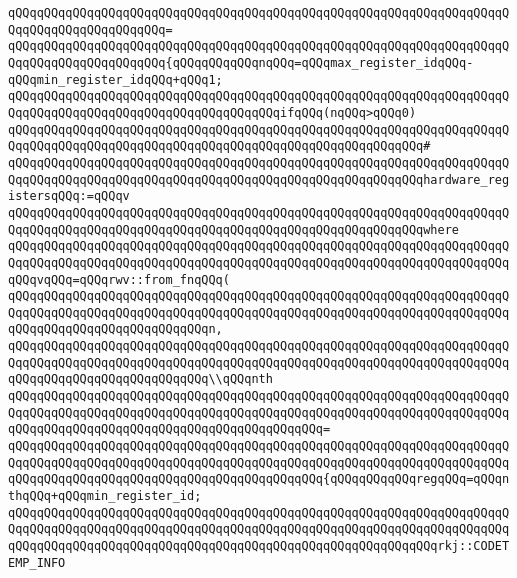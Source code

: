 \verb|qQQqqQQqqQQqqQQqqQQqqQQqqQQqqQQqqQQqqQQqqQQqqQQqqQQqqQQqqQQqqQQqqQQqqQQqqQQqqQQqqQQqqQQqqQQq=|\newline
\verb|qQQqqQQqqQQqqQQqqQQqqQQqqQQqqQQqqQQqqQQqqQQqqQQqqQQqqQQqqQQqqQQqqQQqqQQqqQQqqQQqqQQqqQQqqQQq{qQQqqQQqqQQqnqQQq=qQQqmax_register_idqQQq-qQQqmin_register_idqQQq+qQQq1;|\newline
\newline
\verb|qQQqqQQqqQQqqQQqqQQqqQQqqQQqqQQqqQQqqQQqqQQqqQQqqQQqqQQqqQQqqQQqqQQqqQQqqQQqqQQqqQQqqQQqqQQqqQQqqQQqqQQqqQQqifqQQq(nqQQq>qQQq0)|\newline
\verb|qQQqqQQqqQQqqQQqqQQqqQQqqQQqqQQqqQQqqQQqqQQqqQQqqQQqqQQqqQQqqQQqqQQqqQQqqQQqqQQqqQQqqQQqqQQqqQQqqQQqqQQqqQQqqQQqqQQqqQQqqQQqqQQq#|\newline
\verb|qQQqqQQqqQQqqQQqqQQqqQQqqQQqqQQqqQQqqQQqqQQqqQQqqQQqqQQqqQQqqQQqqQQqqQQqqQQqqQQqqQQqqQQqqQQqqQQqqQQqqQQqqQQqqQQqqQQqqQQqqQQqqQQqhardware_registersqQQq:=qQQqv|\newline
\verb|qQQqqQQqqQQqqQQqqQQqqQQqqQQqqQQqqQQqqQQqqQQqqQQqqQQqqQQqqQQqqQQqqQQqqQQqqQQqqQQqqQQqqQQqqQQqqQQqqQQqqQQqqQQqqQQqqQQqqQQqqQQqqQQqwhere|\newline
\verb|qQQqqQQqqQQqqQQqqQQqqQQqqQQqqQQqqQQqqQQqqQQqqQQqqQQqqQQqqQQqqQQqqQQqqQQqqQQqqQQqqQQqqQQqqQQqqQQqqQQqqQQqqQQqqQQqqQQqqQQqqQQqqQQqqQQqqQQqqQQqqQQqvqQQq=qQQqrwv::from_fnqQQq(|\newline
\verb|qQQqqQQqqQQqqQQqqQQqqQQqqQQqqQQqqQQqqQQqqQQqqQQqqQQqqQQqqQQqqQQqqQQqqQQqqQQqqQQqqQQqqQQqqQQqqQQqqQQqqQQqqQQqqQQqqQQqqQQqqQQqqQQqqQQqqQQqqQQqqQQqqQQqqQQqqQQqqQQqqQQqqQQqn,|\newline
\verb|qQQqqQQqqQQqqQQqqQQqqQQqqQQqqQQqqQQqqQQqqQQqqQQqqQQqqQQqqQQqqQQqqQQqqQQqqQQqqQQqqQQqqQQqqQQqqQQqqQQqqQQqqQQqqQQqqQQqqQQqqQQqqQQqqQQqqQQqqQQqqQQqqQQqqQQqqQQqqQQqqQQqqQQq\\qQQqnth|\newline
\verb|qQQqqQQqqQQqqQQqqQQqqQQqqQQqqQQqqQQqqQQqqQQqqQQqqQQqqQQqqQQqqQQqqQQqqQQqqQQqqQQqqQQqqQQqqQQqqQQqqQQqqQQqqQQqqQQqqQQqqQQqqQQqqQQqqQQqqQQqqQQqqQQqqQQqqQQqqQQqqQQqqQQqqQQqqQQqqQQqqQQqqQQq=|\newline
\verb|qQQqqQQqqQQqqQQqqQQqqQQqqQQqqQQqqQQqqQQqqQQqqQQqqQQqqQQqqQQqqQQqqQQqqQQqqQQqqQQqqQQqqQQqqQQqqQQqqQQqqQQqqQQqqQQqqQQqqQQqqQQqqQQqqQQqqQQqqQQqqQQqqQQqqQQqqQQqqQQqqQQqqQQqqQQqqQQqqQQqqQQq{qQQqqQQqqQQqregqQQq=qQQqnthqQQq+qQQqmin_register_id;|\newline
\newline
\verb|qQQqqQQqqQQqqQQqqQQqqQQqqQQqqQQqqQQqqQQqqQQqqQQqqQQqqQQqqQQqqQQqqQQqqQQqqQQqqQQqqQQqqQQqqQQqqQQqqQQqqQQqqQQqqQQqqQQqqQQqqQQqqQQqqQQqqQQqqQQqqQQqqQQqqQQqqQQqqQQqqQQqqQQqqQQqqQQqqQQqqQQqqQQqqQQqqQQqqQQqrkj::CODETEMP_INFO|\newline
